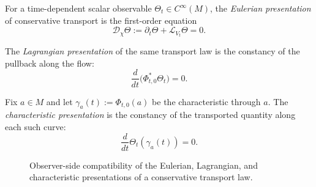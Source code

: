 \begin{definition}
\label{def:eulerian-presentation}
For a time-dependent scalar observable $\Theta_t \in C^\infty(M)$, the
\emph{Eulerian presentation} of conservative transport is the first-order
equation
\[
\mathcal D_\chi \Theta := \partial_t \Theta + \mathcal L_{V_t}\Theta = 0.
\]
\end{definition}

\begin{definition}
\label{def:lagrangian-presentation}
The \emph{Lagrangian presentation} of the same transport law is the constancy of
the pullback along the flow:
\[
\frac{d}{dt}\bigl(\Phi_{t,0}^* \Theta_t\bigr)=0.
\]
\end{definition}

\begin{definition}
\label{def:characteristic-presentation}
Fix $a \in M$ and let $\gamma_a(t):=\Phi_{t,0}(a)$ be the characteristic
through $a$. The \emph{characteristic presentation} is the constancy of the
transported quantity along each such curve:
\[
\frac{d}{dt}\Theta_t(\gamma_a(t))=0.
\]
\end{definition}

\begin{figure}[ht]
\centering
{}
\caption{Observer-side compatibility of the Eulerian, Lagrangian, and characteristic presentations of a conservative transport law.}
\label{fig:observer-triad}
\end{figure}

